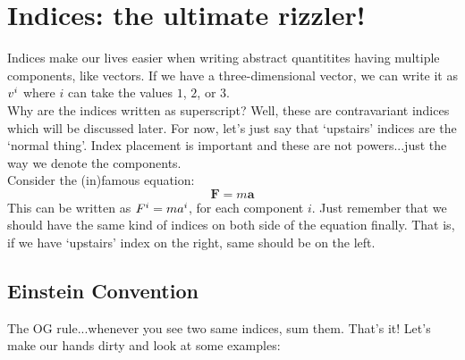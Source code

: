 \section{Indices: the ultimate rizzler!}
Indices make our lives easier when writing abstract quantitites having multiple components, like vectors. If we have a three-dimensional vector, we can write it as $v\indices{^i}$ where $i$ can take the values $1$, $2$, or $3$.\\[0.3cm]
 Why are the indices written as superscript? Well, these are contravariant indices which will be discussed later. For now, let's just say that `upstairs' indices are the `normal thing'. Index placement is important and these are not powers...just the way we denote the components.\\[0.3cm]
 Consider the (in)famous equation: 
 $$\mathbf{F}= m \mathbf{a}$$
 This can be written as $F\indices{^i} = m a\indices{^i}$, for each component $i$. Just remember that we should have the same kind of indices on both side of the equation finally. That is, if we have `upstairs' index on the right, same should be on the left.
 \subsection{Einstein Convention}
 The OG rule...whenever you see two same indices, sum them.  That's it! Let's make our hands dirty and look at some examples:
